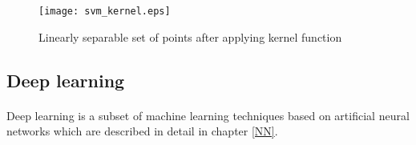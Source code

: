 \begin{figure}[!h]
	\texttt{[image: svm\_kernel.eps]}
	\centering
	\caption{Linearly separable set of points after applying kernel function}
	\label{svm_kernel}
\end{figure}

\subsection{Deep learning}
\paragraph{}
Deep learning is a subset of machine learning techniques based on artificial neural networks which are described in detail in chapter \ref{NN}.
